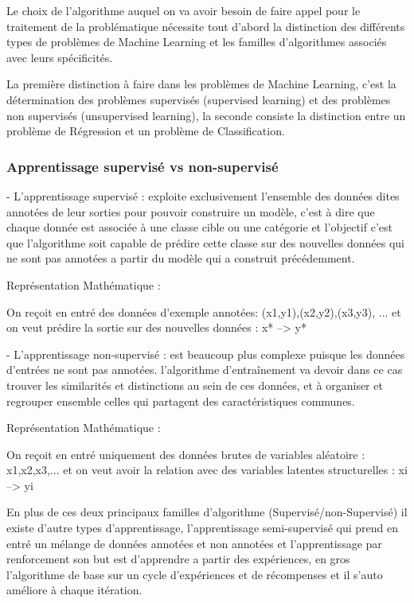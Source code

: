 Le choix de l'algorithme auquel  on va avoir besoin de faire appel pour le traitement de la problématique nécessite tout d'abord  la distinction des différents types de problèmes de Machine Learning et les familles d'algorithmes associés avec leurs spécificités.

La première distinction à faire dans les problèmes de Machine Learning, c'est la détermination des problèmes supervisés (supervised learning) et des problèmes non supervisés (unsupervised learning), la seconde consiste la distinction entre un problème de Régression et un problème de Classification.

\subsubsection{Apprentissage supervisé vs non-supervisé}


- L'apprentissage supervisé : exploite exclusivement l'ensemble des données dites annotées de leur sorties pour pouvoir construire un modèle, c'est à dire que chaque donnée est associée à une classe cible ou une catégorie et l'objectif c'est que l'algorithme soit capable de prédire cette classe sur des nouvelles données qui ne sont pas annotées a partir du modèle qui a construit précédemment.

Représentation Mathématique : 
    
    On reçoit en entré des données d'exemple annotées:
    (x1,y1),(x2,y2),(x3,y3), ... et on veut prédire la sortie sur des nouvelles données :  x* --> y* 
    

- L'apprentissage non-supervisé : est beaucoup plus complexe puisque les données d'entrées ne sont pas annotées. l'algorithme d'entraînement va devoir dans ce cas  trouver  les similarités et distinctions au sein de ces données, et à organiser et regrouper ensemble celles qui partagent des caractéristiques communes.

Représentation Mathématique : 
    
    On reçoit en entré uniquement des données brutes de variables aléatoire : x1,x2,x3,... et on veut avoir la relation avec des variables latentes structurelles :  xi --> yi 
    
En plus de ces deux principaux familles d'algorithme (Supervisé/non-Supervisé) il existe d'autre types d'apprentissage, l'apprentissage semi-supervisé qui prend en entré un mélange de données annotées et non annotées et l'apprentissage par renforcement son but est d'apprendre a partir des expériences, en gros l'algorithme de base sur un cycle d'expériences et de récompenses et il s'auto améliore à chaque itération.

